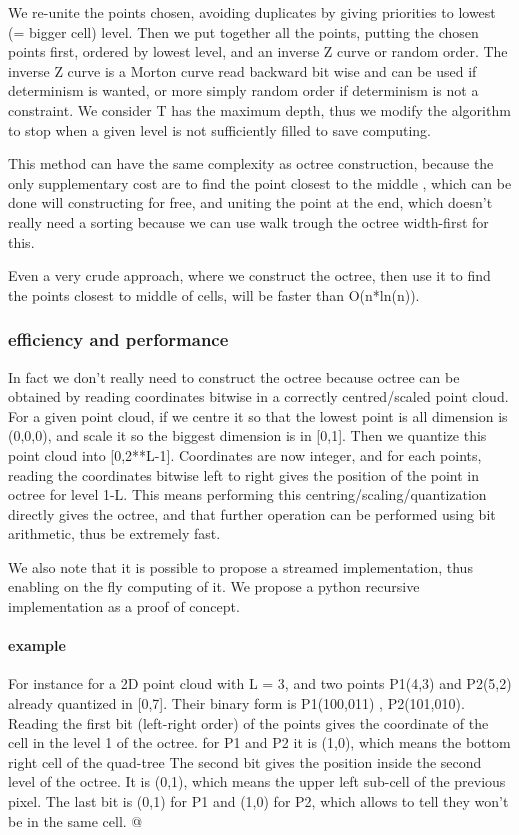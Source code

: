			We re-unite the points chosen, avoiding duplicates by giving priorities to lowest (= bigger cell) level.
			Then we put together all the points, putting the chosen points first, ordered by lowest level,  and an inverse Z curve or random order. 
			The inverse Z curve is a Morton curve read backward bit wise and can be used if determinism is wanted, or more simply random order if determinism is not a constraint.
			We consider T has the maximum depth, thus we modify the algorithm to stop when a given level is not sufficiently filled to save computing.

			This method can have the same complexity as octree construction, because the only supplementary cost are to find the point closest to the middle , which can be done will constructing for free, and uniting the point at the end, which doesn't really need a sorting because we can use walk trough the octree width-first for this.
			
			Even a very crude approach, where we construct the octree, then use it to find the points closest to middle of cells, will be faster than O(n*ln(n)).
			
		\subsubsection{efficiency and performance}
			In fact we don't really need to construct the octree because octree can be obtained by reading coordinates bitwise in a correctly centred/scaled point cloud.
			For a given point cloud, if we centre it so that the lowest point is all dimension is (0,0,0), and scale it so the biggest dimension is in [0,1].
			Then we quantize this point cloud into [0,2**L-1].
			Coordinates are now integer, and for each points, reading the coordinates bitwise left to right gives the position of the point in octree for level 1-L.
			This means performing this centring/scaling/quantization directly gives the octree, and that further operation can be performed using bit arithmetic, thus be extremely fast.
			
			We also note that it is possible to propose a streamed implementation, thus enabling on the fly computing of it.
			We propose a python recursive implementation as a proof of concept.
			
			\paragraph{example} 
				For instance for a 2D point cloud with L = 3, and two points P1(4,3) and P2(5,2) already quantized in [0,7].
				Their binary form is P1(100,011) , P2(101,010).
				Reading the first bit (left-right order) of the points gives the coordinate of the cell in the level 1 of the octree.
				for P1 and P2 it is (1,0), which means the bottom right cell of the quad-tree
				The second bit gives the position inside the second level of the octree.
				It is (0,1), which means the upper left sub-cell of the previous pixel.
				The last bit is (0,1) for P1 and (1,0) for P2, which allows to tell they won't be in the same cell.
				@
				 
